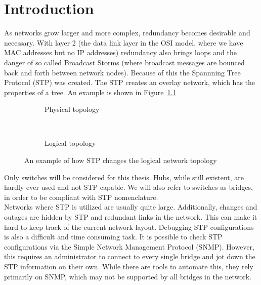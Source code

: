 \chapter{Introduction}
As networks grow larger and more complex, redundancy becomes desirable and necessary.
With layer 2 (the data link layer in the OSI model, where we have MAC addresses but no IP addresses) redundancy also brings loops and the danger of so called Broadcast Storms (where broadcast messages are bounced back and forth between network nodes).
Because of this the Spannning Tree Protocol (STP)\cite{perlman85} was created.
The STP creates an overlay network, which has the properties of a tree.
An example is shown in Figure~\ref{fig:stp_example}

\begin{figure}[h]
    \begin{center}
    \begin{subfigure}[b]{0.4\textwidth}
    \caption{Physical topology}
    \end{subfigure}
    ~
    \begin{subfigure}[b]{0.4\textwidth}
    \caption{Logical topology}
    \end{subfigure}
    \end{center}
    \caption{An example of how STP changes the logical network topology}
    \label{fig:stp_example}
\end{figure}

Only switches will be considered for this thesis.
Hubs, while still existent, are hardly ever used and not STP capable.
We will also refer to switches as bridges, in order to be compliant with STP nomenclature.\\

Networks where STP is utilized are usually quite large.
Additionally, changes and outages are hidden by STP and redundant links in the network.
This can make it hard to keep track of the current network layout.
Debugging STP configurations is also a difficult and time consuming task.
It is possible to check STP configurations via the Simple Network Management Protocol (SNMP).
However, this requires an administrator to connect to every single bridge and jot down the STP information on their own.
While there are tools to automate this, they rely primarily on SNMP, which may not be supported by all bridges in the network.\\

